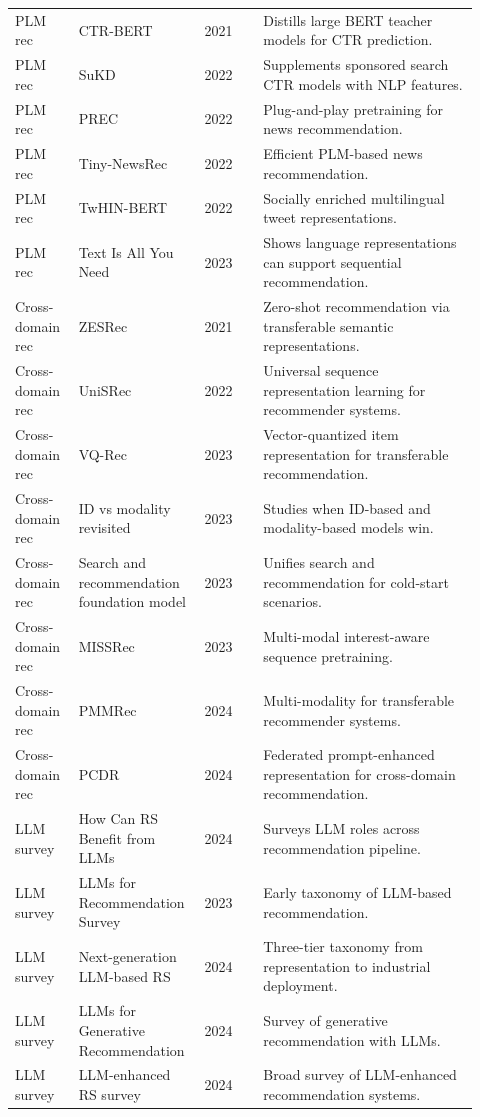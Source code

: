 \documentclass[11pt]{article}
\begin{document}
\begin{longtable}{@{}p{0.13\linewidth}p{0.23\linewidth}p{0.12\linewidth}p{0.44\linewidth}@{}}
PLM rec & CTR-BERT & 2021 & Distills large BERT teacher models for CTR prediction.\\
PLM rec & SuKD & 2022 & Supplements sponsored search CTR models with NLP features.\\
PLM rec & PREC & 2022 & Plug-and-play pretraining for news recommendation.\\
PLM rec & Tiny-NewsRec & 2022 & Efficient PLM-based news recommendation.\\
PLM rec & TwHIN-BERT & 2022 & Socially enriched multilingual tweet representations.\\
PLM rec & Text Is All You Need & 2023 & Shows language representations can support sequential recommendation.\\
Cross-domain rec & ZESRec & 2021 & Zero-shot recommendation via transferable semantic representations.\\
Cross-domain rec & UniSRec & 2022 & Universal sequence representation learning for recommender systems.\\
Cross-domain rec & VQ-Rec & 2023 & Vector-quantized item representation for transferable recommendation.\\
Cross-domain rec & ID vs modality revisited & 2023 & Studies when ID-based and modality-based models win.\\
Cross-domain rec & Search and recommendation foundation model & 2023 & Unifies search and recommendation for cold-start scenarios.\\
Cross-domain rec & MISSRec & 2023 & Multi-modal interest-aware sequence pretraining.\\
Cross-domain rec & PMMRec & 2024 & Multi-modality for transferable recommender systems.\\
Cross-domain rec & PCDR & 2024 & Federated prompt-enhanced representation for cross-domain recommendation.\\
LLM survey & How Can RS Benefit from LLMs & 2024 & Surveys LLM roles across recommendation pipeline.\\
LLM survey & LLMs for Recommendation Survey & 2023 & Early taxonomy of LLM-based recommendation.\\
LLM survey & Next-generation LLM-based RS & 2024 & Three-tier taxonomy from representation to industrial deployment.\\
LLM survey & LLMs for Generative Recommendation & 2024 & Survey of generative recommendation with LLMs.\\
LLM survey & LLM-enhanced RS survey & 2024 & Broad survey of LLM-enhanced recommendation systems.\\

\end{longtable}
\end{document}
